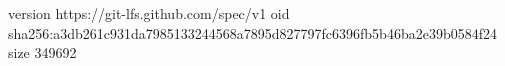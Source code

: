 version https://git-lfs.github.com/spec/v1
oid sha256:a3db261c931da7985133244568a7895d827797fc6396fb5b46ba2e39b0584f24
size 349692
